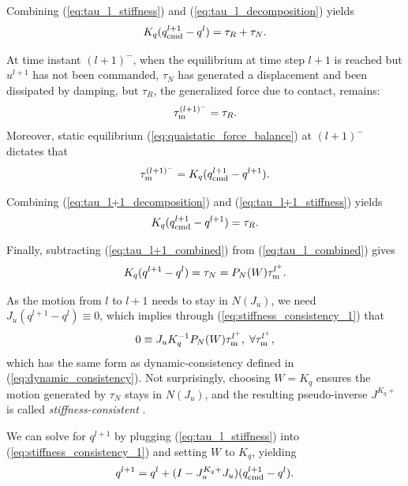 Combining (\ref{eq:tau_l_stiffness}) and (\ref{eq:tau_l_decomposition}) yields
\begin{equation}
\label{eq:tau_l_combined}
K_q(\qcmd[l+1] - q^l) = \tau_R +\tau_N.
\end{equation}

At time instant $(l+1)^-$, when the equilibrium at time step $l+1$ is reached but $u^{l+1}$ has not been commanded, $\tau_N$ has generated a displacement and been dissipated by damping, but $\tau_R$, the generalized force due to contact, remains:
\begin{equation}
\label{eq:tau_l+1_decomposition}
\tauM^{(l+1)^-} = \tau_R.
\end{equation}
Moreover, static equilibrium (\ref{eq:quaistatic_force_balance}) at $(l+1)^-$ dictates that 
\begin{equation}
\label{eq:tau_l+1_stiffness}
\tauM^{(l+1)^-} = K_q(\qcmd[l+1] - q^{l+1}).
\end{equation}

Combining (\ref{eq:tau_l+1_decomposition}) and (\ref{eq:tau_l+1_stiffness}) yields 
\begin{equation}
\label{eq:tau_l+1_combined}
K_q(\qcmd[l+1] - q^{l+1}) = \tau_R.
\end{equation}

Finally, subtracting (\ref{eq:tau_l+1_combined}) from (\ref{eq:tau_l_combined}) gives
\begin{equation}
\label{eq:stiffness_consistency_1}
K_q(q^{l+1} - q^l) = \tau_N = P_N(W) \tauM^{l^+}.
\end{equation}

As the motion from $l$ to $l+1$ needs to stay in $N(J_u)$, we need $J_u(q^{l+1} - q^l) \equiv 0$, which implies through (\ref{eq:stiffness_consistency_1}) that
\begin{equation}
0 \equiv J_u K_q^{-1}P_N(W) \tau_{\text{m}}^{l^+}, \; \forall \tau_{\text{m}}^{l^+},
\end{equation}
which has the same form as dynamic-consistency defined in (\ref{eq:dynamic_consistency}). Not surprisingly, choosing $W = K_q$ ensures the motion generated by $\tau_N$ stays in $N(J_u)$, and the resulting pseudo-inverse $J^{K_q+}$ is called \textit{stiffness-consistent} \cite{dietrich2015overview}.

We can solve for $q^{l+1}$ by plugging (\ref{eq:tau_l_stiffness}) into (\ref{eq:stiffness_consistency_1}) and setting $W$ to $K_q$, yielding
\begin{equation}
\label{eq:state_null_space_projection}
q^{l+1} = q^l + (I - J_u^{K_q+}J_u) (\qcmd[l+1] - q^l).
\end{equation}

